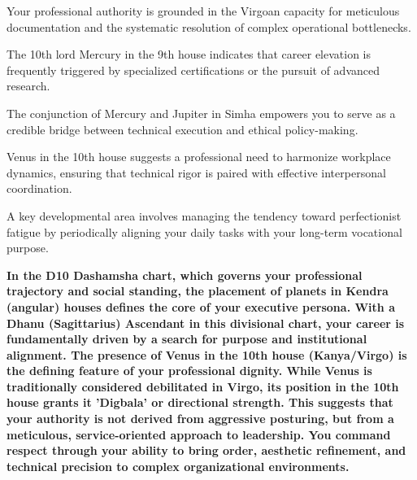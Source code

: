 \begin{diamondlist}
  \item {\fontsize{8.5}{12}\selectfont Your professional authority is grounded in the Virgoan capacity for meticulous documentation and the systematic resolution of complex operational bottlenecks.}
  \item {\fontsize{8.5}{12}\selectfont The 10th lord Mercury in the 9th house indicates that career elevation is frequently triggered by specialized certifications or the pursuit of advanced research.}
  \item {\fontsize{8.5}{12}\selectfont The conjunction of Mercury and Jupiter in Simha empowers you to serve as a credible bridge between technical execution and ethical policy-making.}
  \item {\fontsize{8.5}{12}\selectfont Venus in the 10th house suggests a professional need to harmonize workplace dynamics, ensuring that technical rigor is paired with effective interpersonal coordination.}
  \item {\fontsize{8.5}{12}\selectfont A key developmental area involves managing the tendency toward perfectionist fatigue by periodically aligning your daily tasks with your long-term vocational purpose.}
\end{diamondlist}


\label{topic28}

{\fontsize{9.5}{13.8}\selectfont\bfseries\color{DeepSlate} In the D10 Dashamsha chart, which governs your professional trajectory and social standing, the placement of planets in Kendra (angular) houses defines the core of your executive persona. With a Dhanu (Sagittarius) Ascendant in this divisional chart, your career is fundamentally driven by a search for purpose and institutional alignment. The presence of Venus in the 10th house (Kanya/Virgo) is the defining feature of your professional dignity. While Venus is traditionally considered debilitated in Virgo, its position in the 10th house grants it 'Digbala' or directional strength. This suggests that your authority is not derived from aggressive posturing, but from a meticulous, service-oriented approach to leadership. You command respect through your ability to bring order, aesthetic refinement, and technical precision to complex organizational environments.}\par\vspace{2mm}

